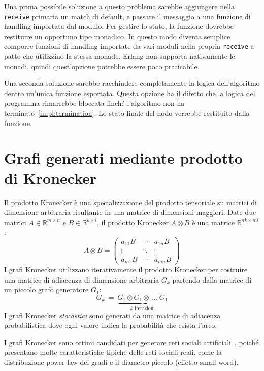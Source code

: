 \documentclass[target=bach,aauheader=,style=]{thud}
\newcommand{\eng}[1]{\foreignlanguage{english}{#1}}
\begin{document}
Una prima possibile soluzione a questo problema sarebbe aggiungere nella \lstinline{receive} primaria un match di default, e passare il messaggio a una funzione di \eng{handling} importata dal modulo. Per gestire lo stato, la funzione dovrebbe restituire un opportuno tipo monadico. In questo modo diventa semplice comporre funzioni di \eng{handling} importate da vari moduli nella propria \lstinline{receive} a patto che utilizzino la stessa monade. Erlang non supporta nativamente le monadi, quindi quest'opzione potrebbe essere poco praticabile.

Una seconda soluzione sarebbe racchiudere completamente la logica dell'algoritmo dentro un'unica funzione esportata. Questa opzione ha il difetto che la logica del programma rimarrebbe bloccata finché l'algoritmo non ha terminato~\ref{impl:termination}. Lo stato finale del nodo verrebbe restituito dalla funzione.

\section{Grafi generati mediante prodotto di Kronecker}\label{impl:kronecker}

Il prodotto Kronecker è una specializzazione del prodotto tensoriale su matrici di dimensione arbitraria risultante in una matrice di dimensioni maggiori. Date due matrici $A\in\mathbb{R}^{m\times n}$ e $B\in\mathbb{R}^{k\times l}$, il prodotto Kronecker $A\otimes B$ è una matrice $\mathbb{R}^{nk\times ml}$:
$$
A\otimes B=\begin{pmatrix}
  a_{11}B & \cdots & a_{1n}B\\
  \vdots & \ddots & \vdots\\
  a_{m1}B & \cdots & a_{mn}B 
\end{pmatrix}
$$
I grafi Kronecker utilizzano iterativamente il prodotto Kronecker per costruire una matrice di adiacenza di dimensione arbitraria $G_k$ partendo dalla matrice di un piccolo grafo generatore $G_1$:
$$
G_k\:=\:\underbrace{G_1\otimes G_1\otimes\:\ldots\: G_1}_{k\text{ iterazioni}}
$$
I grafi Kronecker \emph{stocastici} sono generati da una matrice di adiacenza probabilistica dove ogni valore indica la probabilità che esista l'arco.

I grafi Kronecker sono ottimi candidati per generare reti sociali artificiali~\cite{10.5555/1756006.1756039}, poiché presentano molte caratteristiche tipiche delle reti sociali reali, come la distribuzione \eng{power-law} dei gradi e il diametro piccolo (effetto \eng{small word}).
\end{document}
